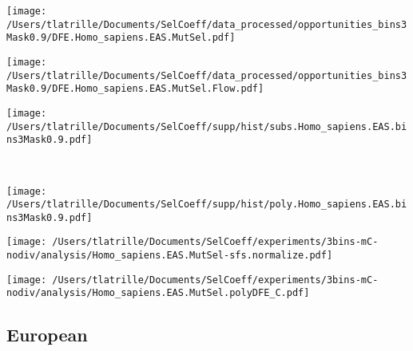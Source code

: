 \documentclass{article}
\begin{document}
    \begin{minipage}{0.32\linewidth}
        \texttt{[image: /Users/tlatrille/Documents/SelCoeff/data\_processed/opportunities\_bins3Mask0.9/DFE.Homo\_sapiens.EAS.MutSel.pdf]}
    \end{minipage}
    \begin{minipage}{0.32\linewidth}
        \texttt{[image: /Users/tlatrille/Documents/SelCoeff/data\_processed/opportunities\_bins3Mask0.9/DFE.Homo\_sapiens.EAS.MutSel.Flow.pdf]}
    \end{minipage}
    \begin{minipage}{0.32\linewidth}
        \texttt{[image: /Users/tlatrille/Documents/SelCoeff/supp/hist/subs.Homo\_sapiens.EAS.bins3Mask0.9.pdf]}
    \end{minipage}
    \\
    \begin{minipage}{0.32\linewidth}
        \texttt{[image: /Users/tlatrille/Documents/SelCoeff/supp/hist/poly.Homo\_sapiens.EAS.bins3Mask0.9.pdf]}
    \end{minipage}
    \begin{minipage}{0.32\linewidth}
        \texttt{[image: /Users/tlatrille/Documents/SelCoeff/experiments/3bins-mC-nodiv/analysis/Homo\_sapiens.EAS.MutSel-sfs.normalize.pdf]}
    \end{minipage}
    \begin{minipage}{0.32\linewidth}
        \texttt{[image: /Users/tlatrille/Documents/SelCoeff/experiments/3bins-mC-nodiv/analysis/Homo\_sapiens.EAS.MutSel.polyDFE\_C.pdf]}
    \end{minipage}
    \subsection{European}
\end{document}
